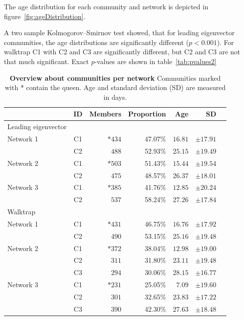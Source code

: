 The age distribution for each community and network is depicted in figure~\ref{fig:ageDistribution}.

A two sample Kolmogorov–Smirnov test showed, that for leading eigenvector communities, the age distributions are significantly different ($p< 0.001$). For walktrap C1 with C2 and C3 are significantly different, but C2 and C3 are not that much significant. Exact $p$-values are shown in table~\ref{tab:pvalues2}

\begin{table}
\centering
\caption[Overview about communities]{\textbf{Overview about communities per network} Communities marked with * contain the queen. Age and standard deviation (SD) are measured in days.}
\label{tab:communities}
\vspace*{5mm}
\begin{tabular}{lcrrrrr}
	\toprule
	{}  & ID & Members & Proportion & Age & SD\\
	\midrule
	\rowcolor{Gray}
	Leading eigenvector &&&&&\\
	\midrule 
	\quad Network 1  & C1 & $*434$  & 47.07\% & $16.81$ & $\pm17.91$ \\
	                 & C2 & $488$   & 52.93\% & $25.15$ & $\pm19.49$ \\
	\midrule   							
	\quad Network 2  & C1 & $*503$  & 51.43\% & $15.44$ & $\pm19.54$ \\
	                 & C2 & $475$   & 48.57\% & $26.37$ & $\pm18.01$ \\
	\midrule  
	\quad Network 3  & C1 & $*385$  & 41.76\% & $12.85$ & $\pm20.24$ \\
	                 & C2 & $537$   & 58.24\% & $27.26$ & $\pm17.84$ \\
    \midrule
    \rowcolor{Gray}
    Walktrap &&&&&\\
    \midrule 
	\quad Network 1 & C1 & $*431$ & 46.75\% & $16.76$ & $\pm17.92$\\
	                & C2 & $490$  & 53.15\% & $25.16$ & $\pm19.48$\\
	\midrule
	\quad Network 2 & C1 & $*372$ & 38.04\% & $12.98$ & $\pm19.00$\\
				    & C2 & $311$  & 31.80\% & $23.11$ & $\pm19.48$\\
				    & C3 & $294$  & 30.06\% & $28.15$ & $\pm16.77$\\            
	\midrule
	\quad Network 3 & C1 & $*231$  & 25.05\% & $7.09$  & $\pm19.60$\\
					& C2 & $301$  & 32.65\% & $23.83$ & $\pm17.22$\\
					& C3 & $390$  & 42.30\% & $27.63$ & $\pm18.48$\\
	\bottomrule
\end{tabular}
\end{table}

